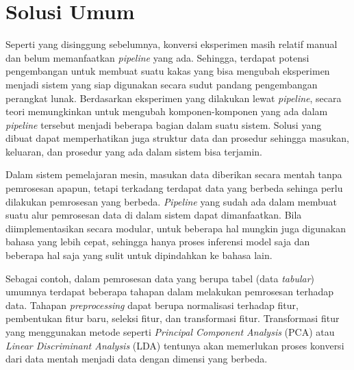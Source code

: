 \section{Solusi Umum}

Seperti yang disinggung sebelumnya, konversi eksperimen masih relatif manual dan belum memanfaatkan \textit{pipeline} yang ada.
Sehingga, terdapat potensi pengembangan untuk membuat suatu kakas yang bisa mengubah eksperimen menjadi sistem yang siap digunakan secara sudut pandang pengembangan perangkat lunak.
Berdasarkan eksperimen yang dilakukan lewat \textit{pipeline}, secara teori memungkinkan untuk mengubah komponen-komponen yang ada dalam \textit{pipeline} tersebut menjadi beberapa bagian dalam suatu sistem.
Solusi yang dibuat dapat memperhatikan juga struktur data dan prosedur sehingga masukan, keluaran, dan prosedur yang ada dalam sistem bisa terjamin.

Dalam sistem pemelajaran mesin, masukan data diberikan secara mentah tanpa pemrosesan apapun, tetapi terkadang terdapat data yang berbeda sehinga perlu dilakukan pemrosesan yang berbeda.
\textit{Pipeline} yang sudah ada dalam membuat suatu alur pemrosesan data di dalam sistem dapat dimanfaatkan.
Bila diimplementasikan secara modular, untuk beberapa hal mungkin juga digunakan bahasa yang lebih cepat, sehingga hanya proses inferensi model saja dan beberapa hal saja yang sulit untuk dipindahkan ke bahasa lain.

Sebagai contoh, dalam pemrosesan data yang berupa tabel (data \textit{tabular}) umumnya terdapat beberapa tahapan dalam melakukan pemrosesan terhadap data.
Tahapan \textit{preprocessing} dapat berupa normalisasi terhadap fitur, pembentukan fitur baru, seleksi fitur, dan transformasi fitur.
Transformasi fitur yang menggunakan metode seperti \textit{Principal Component Analysis} (PCA) atau \textit{Linear Discriminant Analysis} (LDA) tentunya akan memerlukan proses konversi dari data mentah menjadi data dengan dimensi yang berbeda.